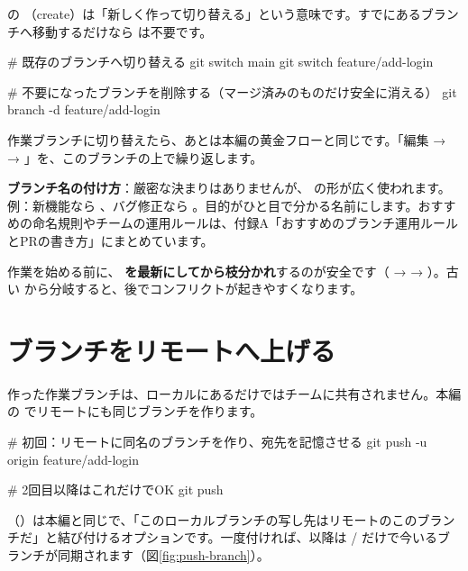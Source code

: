  の （create）は「新しく作って切り替える」という意味です。すでにあるブランチへ移動するだけなら  は不要です。

\begin{codebox}[bash]
\begin{code}
# 既存のブランチへ切り替える
git switch main
git switch feature/add-login

# 不要になったブランチを削除する（マージ済みのものだけ安全に消える）
git branch -d feature/add-login
\end{code}
\end{codebox}

作業ブランチに切り替えたら、あとは本編の黄金フローと同じです。「編集 →  → 」を、このブランチの上で繰り返します。

\begin{hintbox}
\textbf{ブランチ名の付け方}：厳密な決まりはありませんが、 の形が広く使われます。例：新機能なら 、バグ修正なら 。目的がひと目で分かる名前にします。おすすめの命名規則やチームの運用ルールは、付録A「おすすめのブランチ運用ルールとPRの書き方」にまとめています。
\end{hintbox}

\begin{warnbox}
作業を始める前に、\textbf{ を最新にしてから枝分かれ}するのが安全です（ →  → ）。古い  から分岐すると、後でコンフリクトが起きやすくなります。
\end{warnbox}

\section{ブランチをリモートへ上げる}

作った作業ブランチは、ローカルにあるだけではチームに共有されません。本編の  でリモートにも同じブランチを作ります。

\begin{codebox}[bash]
\begin{code}
# 初回：リモートに同名のブランチを作り、宛先を記憶させる
git push -u origin feature/add-login

# 2回目以降はこれだけでOK
git push
\end{code}
\end{codebox}

（）は本編と同じで、「このローカルブランチの写し先はリモートのこのブランチだ」と結び付けるオプションです。一度付ければ、以降は  /  だけで今いるブランチが同期されます（図\ref{fig:push-branch}）。

